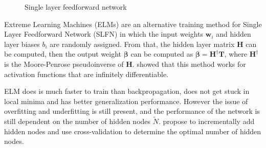 \begin{figure}[htpb]
    \caption{Single layer feedforward network}%
\end{figure}

Extreme Learning Machines (ELMs) are an alternative training method for Single
Layer Feedforward Network (SLFN) in which the input weights $\textbf{w}_i$ and
hidden layer biases $b_i$ are randomly assigned. From that, the hidden layer
matrix $\textbf{H}$ can be computed, then the output weight $\boldsymbol\beta$
can be computed as $\boldsymbol\beta = \textbf{H}^{\dagger} \textbf{T}$, where
$\textbf{H}^{\dagger}$ is the Moore-Penrose pseudoinverse of $\textbf{H}$.
\Textcite{huangExtremeLearningMachine2006} showed that this method works for
activation functions that are infinitely differentiable.

ELM does is much faster to train than backpropagation, does not get stuck in
local minima and has better generalization performance. However the issue of
overfitting and underfitting is still present, and the performance of the
network is still dependent on the number of hidden nodes $\tilde{N}$.
\Textcite{huangExtremeLearningMachine2012} propose to incrementally add hidden
nodes and use cross-validation to determine the optimal number of hidden nodes.

